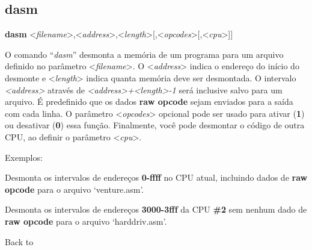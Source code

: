\documentclass[letterpaper,10pt,brazil]{sphinxmanual}
\begin{document}
\subsection{dasm}
\label{debugger/memory:debugger-command-dasm}\label{debugger/memory:dasm}
\begin{DUlineblock}{0em}
\item[]
\begin{DUlineblock}{\DUlineblockindent}
\item[] \textbf{dasm} \textless{}\emph{filename}\textgreater{},\textless{}\emph{address}\textgreater{},\textless{}\emph{length}\textgreater{}{[},\textless{}\emph{opcodes}\textgreater{}{[},\textless{}\emph{cpu}\textgreater{}{]}{]}
\item[] 
\end{DUlineblock}
\item[] O comando ``\emph{dasm}'' desmonta a memória de um programa para um arquivo definido no parâmetro \textless{}\emph{filename}\textgreater{}. O \textless{}\emph{address}\textgreater{} indica o endereço do início do desmonte e \textless{}\emph{length}\textgreater{} indica quanta memória deve ser desmontada. O intervalo \emph{\textless{}address\textgreater{}} através de \emph{\textless{}address\textgreater{}+\textless{}length\textgreater{}-1} será inclusive salvo para um arquivo. É predefinido que os dados \textbf{raw opcode} sejam enviados para a saída com cada linha. O parâmetro \textless{}\emph{opcodes}\textgreater{} opcional pode ser usado para ativar (\textbf{1}) ou desativar (\textbf{0}) essa função. Finalmente, você pode desmontar o código de outra CPU, ao definir o parâmetro \textless{}\emph{cpu}\textgreater{}.
\item[] 
\item[] Exemplos:
\item[] 
\item[]
\begin{DUlineblock}{\DUlineblockindent}
\item[] 
\item[] 
\end{DUlineblock}
\item[] Desmonta os intervalos de endereços \textbf{0-ffff} no CPU atual, incluindo dados de \textbf{raw opcode} para o arquivo `venture.asm'.
\item[] 
\item[]
\begin{DUlineblock}{\DUlineblockindent}
\item[] 
\item[] 
\end{DUlineblock}
\item[] Desmonta os intervalos de endereços \textbf{3000-3fff} da CPU \textbf{\#2} sem nenhum dado de \textbf{raw opcode} para o arquivo `harddriv.asm'.
\item[] 
\item[] Back to {\hyperref[debugger/memory:debugger\string-memory\string-list]{}}
\end{DUlineblock}
\end{document}
